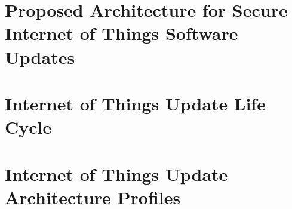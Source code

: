 \documentclass[0-thesis.tex]{subfiles}
\begin{document}
    \section{Proposed Architecture for Secure Internet of Things Software Updates}
    

    \section{Internet of Things Update Life Cycle}
    

    \section{Internet of Things Update Architecture Profiles}
    
\end{document}
